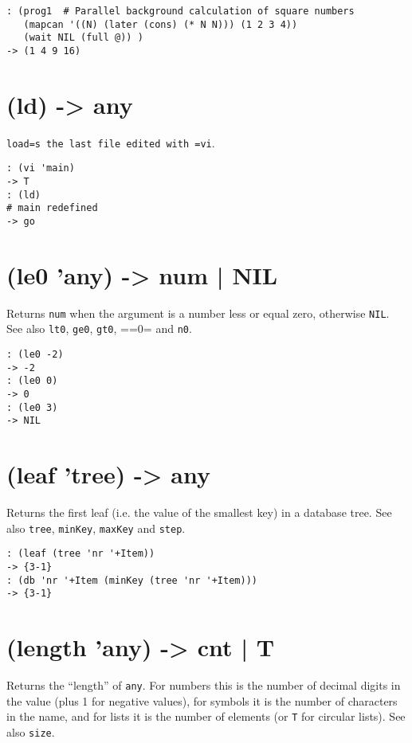 {{{{{{\begin{verbatim}
: (prog1  # Parallel background calculation of square numbers
   (mapcan '((N) (later (cons) (* N N))) (1 2 3 4))
   (wait NIL (full @)) )
-> (1 4 9 16)
\end{verbatim}

 
\section{(ld) -> any}
\label{sec-8-1-12-6}


\texttt{load=s the last file edited with =vi}.


\begin{verbatim}
: (vi 'main)
-> T
: (ld)
# main redefined
-> go
\end{verbatim}

 
\section{(le0 'any) -> num | NIL}
\label{sec-8-1-12-7}


Returns \texttt{num} when the argument is a number less or equal zero,
otherwise \texttt{NIL}. See also \texttt{lt0}, \texttt{ge0}, \texttt{gt0}, ==0= and \texttt{n0}.


\begin{verbatim}
: (le0 -2)
-> -2
: (le0 0)
-> 0
: (le0 3)
-> NIL
\end{verbatim}

 
\section{(leaf 'tree) -> any}
\label{sec-8-1-12-8}


Returns the first leaf (i.e. the value of the smallest key) in a
database tree. See also \texttt{tree}, \texttt{minKey}, \texttt{maxKey} and \texttt{step}.


\begin{verbatim}
: (leaf (tree 'nr '+Item))
-> {3-1}
: (db 'nr '+Item (minKey (tree 'nr '+Item)))
-> {3-1}
\end{verbatim}

 
\section{(length 'any) -> cnt | T}
\label{sec-8-1-12-9}


Returns the ``length'' of \texttt{any}. For numbers this is the number of decimal
digits in the value (plus 1 for negative values), for symbols it is the
number of characters in the name, and for lists it is the number of
elements (or \texttt{T} for circular lists). See also \texttt{size}.


}}}}}}
